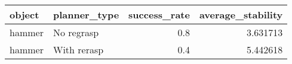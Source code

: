 \begin{tabular}{llrr}
\toprule
 object & planner\_type &  success\_rate &  average\_stability \\
\midrule
 hammer &   No regrasp &           0.8 &           3.631713 \\
 hammer &  With rerasp &           0.4 &           5.442618 \\
\bottomrule
\end{tabular}
